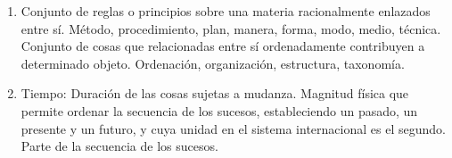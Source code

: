 \begin{enumerate}
    \item Conjunto de reglas o principios sobre una materia racionalmente enlazados entre sí.
    Método, procedimiento, plan, manera, forma, modo, medio, técnica.
    Conjunto de cosas que relacionadas entre sí ordenadamente contribuyen a determinado objeto.
    Ordenación, organización, estructura, taxonomía.
    


\item Tiempo: Duración de las cosas sujetas a mudanza.
    Magnitud física que permite ordenar la secuencia de los sucesos, estableciendo un pasado, un presente y un futuro, y cuya unidad en el sistema internacional es el segundo.
 Parte de la secuencia de los sucesos.
\end{enumerate}






